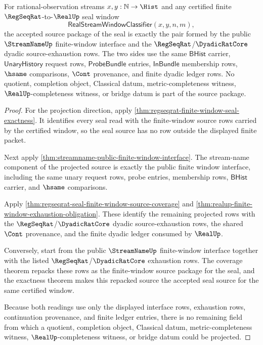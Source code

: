 \begin{theorem}
\label{thm:regseqrat-finite-window-seal-source-exhaustion}
For rational-observation streams $x,y:\mathbb{N}\to\Hist$ and any certified
finite $\RegSeqRat$-to-$\RealUp$ seal window
$$
\mathsf{RealStreamWindowClassifier}(x,y,n,m),
$$
the accepted source package of the seal is exactly the pair formed by the
public $\StreamNameUp$ finite-window interface and the
$\RegSeqRat$/$\DyadicRatCore$ dyadic source-exhaustion rows. The two sides use
the same $\mathsf{BHist}$ carrier, $\mathsf{UnaryHistory}$ request rows,
$\mathsf{ProbeBundle}$ entries, $\mathsf{InBundle}$ membership rows, $\hsame$
comparisons, $\Cont$ provenance, and finite dyadic ledger rows. No quotient,
completion object, Classical datum, metric-completeness witness,
$\RealUp$-completeness witness, or bridge datum is part of the source package.
\end{theorem}
\begin{proof}
For the projection direction, apply
\autoref{thm:regseqrat-finite-window-seal-exactness}. It identifies every seal
read with the finite-window source rows carried by the certified window, so the
seal source has no row outside the displayed finite packet.

Next apply \autoref{thm:streamname-public-finite-window-interface}. The
stream-name component of the projected source is exactly the public finite
window interface, including the same unary request rows, probe entries,
membership rows, $\mathsf{BHist}$ carrier, and $\hsame$ comparisons.

Apply \autoref{thm:regseqrat-seal-finite-window-source-coverage} and
\autoref{thm:realup-finite-window-exhaustion-obligation}. These identify the
remaining projected rows with the $\RegSeqRat$/$\DyadicRatCore$ dyadic
source-exhaustion rows, the shared $\Cont$ provenance, and the finite dyadic
ledger consumed by $\RealUp$.

Conversely, start from the public $\StreamNameUp$ finite-window interface
together with the listed $\RegSeqRat$/$\DyadicRatCore$ exhaustion rows. The
coverage theorem repacks these rows as the finite-window source package for
the seal, and the exactness theorem makes this repacked source the accepted
seal source for the same certified window.

Because both readings use only the displayed interface rows, exhaustion rows,
continuation provenance, and finite ledger entries, there is no remaining
field from which a quotient, completion object, Classical datum,
metric-completeness witness, $\RealUp$-completeness witness, or bridge datum
could be projected.
\end{proof}

